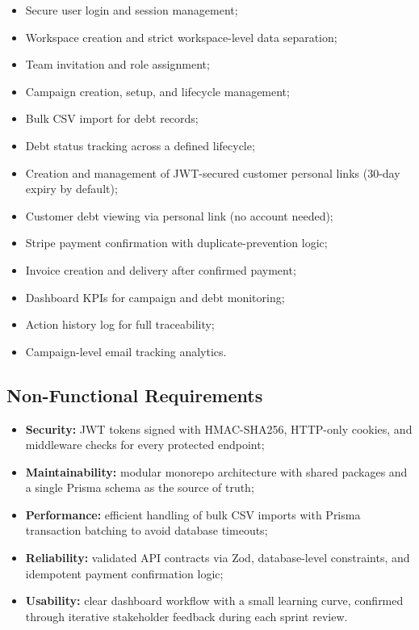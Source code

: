 \documentclass[12pt,a4paper]{report}
\begin{document}
\begin{itemize}
  \item Secure user login and session management;
  \item Workspace creation and strict workspace-level data separation;
  \item Team invitation and role assignment;
  \item Campaign creation, setup, and lifecycle management;
  \item Bulk CSV import for debt records;
  \item Debt status tracking across a defined lifecycle;
  \item Creation and management of JWT-secured customer personal links (30-day
        expiry by default);
  \item Customer debt viewing via personal link (no account needed);
  \item Stripe payment confirmation with duplicate-prevention logic;
  \item Invoice creation and delivery after confirmed payment;
  \item Dashboard KPIs for campaign and debt monitoring;
  \item Action history log for full traceability;
  \item Campaign-level email tracking analytics.
\end{itemize}

\subsection{Non-Functional Requirements}

\begin{itemize}
  \item \textbf{Security:} JWT tokens signed with HMAC-SHA256, HTTP-only cookies,
        and middleware checks for every protected endpoint;
  \item \textbf{Maintainability:} modular monorepo architecture with shared packages
        and a single Prisma schema as the source of truth;
  \item \textbf{Performance:} efficient handling of bulk CSV imports with Prisma
        transaction batching to avoid database timeouts;
  \item \textbf{Reliability:} validated API contracts via Zod, database-level
        constraints, and idempotent payment confirmation logic;
  \item \textbf{Usability:} clear dashboard workflow with a small learning curve,
        confirmed through iterative stakeholder feedback during each sprint review.
\end{itemize}
\end{document}
